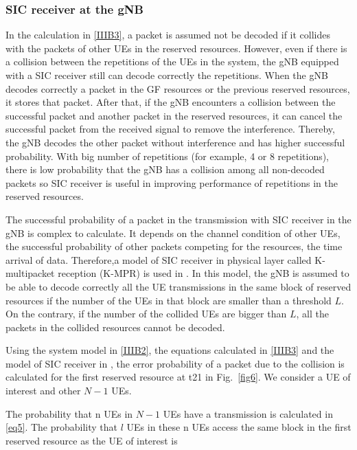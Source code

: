 \documentclass{ieeeaccess}
\begin{document}
\subsubsection{SIC receiver at the gNB}

In the calculation in \ref{IIIB3}, a packet is assumed not be decoded if it collides with the packets of other UEs in the reserved resources. However, even if there is a collision between the repetitions of the UEs in the system, the gNB equipped with a SIC receiver still can decode correctly the repetitions. When the gNB decodes correctly a packet in the GF resources or the previous reserved resources, it stores that packet. After that, if the gNB encounters a collision between the successful packet and another packet in the reserved resources, it can cancel the successful packet from the received signal to remove the interference. Thereby, the gNB decodes the other packet without interference and has higher successful probability. With big number of repetitions (for example, 4 or  8 repetitions), there is low probability that the gNB has a collision among all non-decoded packets so SIC receiver is useful in improving performance of repetitions in the reserved resources.

The successful probability of a packet in the transmission with SIC receiver in the gNB is complex to calculate. It depends on the channel condition of other UEs, the successful probability of other packets competing for the resources, the time arrival of data. Therefore,a model of SIC receiver in physical layer called K-multipacket reception (K-MPR) is used in \cite{ref21}. In this model, the gNB is assumed to be able to decode correctly all the UE transmissions in the same block of reserved resources if the number of the UEs in that block are smaller than a threshold $L$. On the contrary, if the number of the collided UEs are bigger than $L$, all the packets in the collided resources cannot be decoded.

Using the system model in \ref{IIIB2}, the equations calculated in \ref{IIIB3} and the model of SIC receiver in \cite{ref21} , the error probability of a packet due to the collision is calculated for the first reserved resource at t21 in Fig.~\ref{fig6}. We consider a UE of interest and other $N-1$ UEs.

The probability that n UEs in $N-1$ UEs have a transmission is calculated in \eqref{eq5}. The probability that $l$ UEs in these n UEs access the same block in the first reserved resource as the UE of interest is
\end{document}
